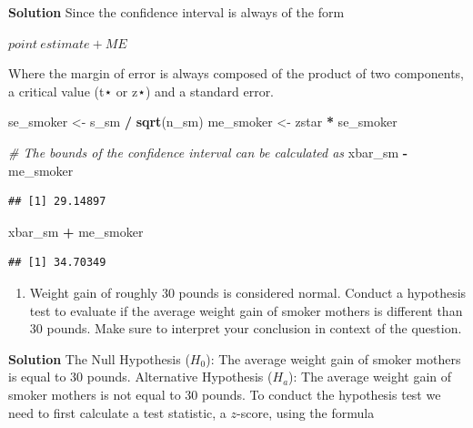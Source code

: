 \documentclass[
]{article}
\newenvironment{Shaded}{\begin{snugshade}}{\end{snugshade}}
\newcommand{\CommentTok}[1]{\textcolor[rgb]{0.56,0.35,0.01}{\textit{#1}}}
\newcommand{\FunctionTok}[1]{\textcolor[rgb]{0.13,0.29,0.53}{\textbf{#1}}}
\newcommand{\NormalTok}[1]{#1}
\newcommand{\OtherTok}[1]{\textcolor[rgb]{0.56,0.35,0.01}{#1}}
\newcommand{\SpecialCharTok}[1]{\textcolor[rgb]{0.81,0.36,0.00}{\textbf{#1}}}
\providecommand{\tightlist}{%
  \setlength{\itemsep}{0pt}\setlength{\parskip}{0pt}}
\begin{document}
\textbf{Solution} Since the confidence interval is always of the form

\begin{center}
$ point~estimate + ME$
\end{center}

Where the margin of error is always composed of the product of two
components, a critical value (t⋆ or z⋆) and a standard error.

\begin{Shaded}
\begin{Highlighting}[]
\NormalTok{se\_smoker }\OtherTok{\textless{}{-}}\NormalTok{ s\_sm }\SpecialCharTok{/} \FunctionTok{sqrt}\NormalTok{(n\_sm)}
\NormalTok{me\_smoker }\OtherTok{\textless{}{-}}\NormalTok{ zstar }\SpecialCharTok{*}\NormalTok{ se\_smoker}

\CommentTok{\# The bounds of the confidence interval can be calculated as}
\NormalTok{xbar\_sm }\SpecialCharTok{{-}}\NormalTok{ me\_smoker}
\end{Highlighting}
\end{Shaded}

\begin{verbatim}
## [1] 29.14897
\end{verbatim}

\begin{Shaded}
\begin{Highlighting}[]
\NormalTok{xbar\_sm }\SpecialCharTok{+}\NormalTok{ me\_smoker}
\end{Highlighting}
\end{Shaded}

\begin{verbatim}
## [1] 34.70349
\end{verbatim}

\begin{enumerate}
\def\labelenumi{\arabic{enumi}.}
\setcounter{enumi}{3}
\tightlist
\item
  Weight gain of roughly 30 pounds is considered normal. Conduct a
  hypothesis test to evaluate if the average weight gain of smoker
  mothers is different than 30 pounds. Make sure to interpret your
  conclusion in context of the question.
\end{enumerate}

\textbf{Solution} The Null Hypothesis (\(H_{0}\)): The average weight
gain of smoker mothers is equal to 30 pounds. Alternative Hypothesis
(\(H_{a}\)): The average weight gain of smoker mothers is not equal to
30 pounds. To conduct the hypothesis test we need to first calculate a
test statistic, a \(z\)-score, using the formula
\end{document}
